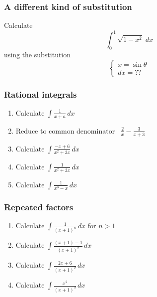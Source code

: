 \documentclass[14pt]{beamer}
\begin{document}
\begin{frame}[t]
	\frametitle{A different kind of substitution}

	Calculate
	\[
		\int_{0}^{1}\sqrt{1 - x^{2}}\; dx
	\]
	using the substitution
	\[
		\begin{cases}
			x = \sin \theta \\
			dx = ??
		\end{cases}
	\]
\end{frame}

\begin{frame}[t]
	\fontsize{13}{13}\selectfont
	\frametitle{Rational integrals}

	\begin{enumerate}
		\item Calculate $\displaystyle \int \frac{1}{x+a}\, dx$
			\vspace{.2cm}

		\item Reduce to common denominator \, $\displaystyle \frac{2}{x}- \frac{3}{x+3}$
			\vspace{.2cm}

		\item Calculate $\displaystyle \int \frac{-x + 6}{x^{2}+ 3x}\, dx$
			\vspace{.2cm}

		\item Calculate $\displaystyle \int \frac{1}{x^{2}+ 3x}\, dx$
			\vspace{.2cm}

		\item Calculate $\displaystyle \int \frac{1}{x^{3}-x}\, dx$
	\end{enumerate}
\end{frame}

\begin{frame}[t]
	\fontsize{13}{13}\selectfont
	\frametitle{Repeated factors}

	\begin{enumerate}
		\item Calculate $\displaystyle \int \frac{1}{(x+1)^{n}}\, dx$ \quad for $n >1$
			\vspace{.2cm}

		\item Calculate $\displaystyle \int \frac{(x+1) - 1}{(x+1)^{2}}\, dx$
			\vspace{.2cm}

		\item Calculate $\displaystyle \int \frac{2x + 6}{(x+1)^{2}}\, dx$
			\vspace{.2cm}

		\item Calculate $\displaystyle \int \frac{x^{2}}{(x+1)^{3}}\, dx$
	\end{enumerate}
\end{frame}
\end{document}
